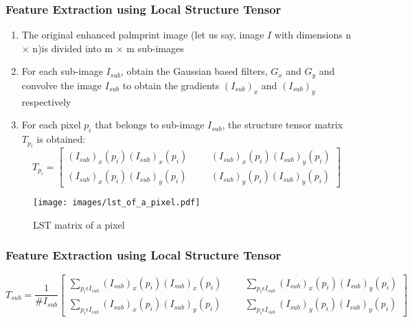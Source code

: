 \documentclass{beamer}
\begin{document}
\begin{frame}
 \frametitle{Feature Extraction using Local Structure Tensor}
  \begin{enumerate}
    \item The original enhanced palmprint image (let us say, image $I$ with dimensions n $\times$ n)is divided into m $\times$ m sub-images 
  \item For each sub-image $I_{sub}$, obtain the Gaussian based filters,
$G_x$ and $G_y$ and convolve the image $I_{sub}$ to obtain the gradients $(I_{sub})_{x}$ and $(I_{sub})_{y}$ respectively 
  \item For each pixel $p_i$ that belongs to sub-image $I_{sub}$, the structure tensor matrix $T_{p_{i}}$ is obtained:
\begin{equation}
 T_{p_{i}} = \begin{bmatrix} (I_{sub})_x(p_i) (I_{sub})_x(p_i) & & & (I_{sub})_x(p_i) (I_{sub})_y(p_i) \\ (I_{sub})_x(p_i) (I_{sub})_y(p_i) & & & (I_{sub})_y(p_i) (I_{sub})_y(p_i) \end{bmatrix}
\end{equation}
  \end{enumerate}
  \begin{figure}[htp]
\begin{center}
\texttt{[image: images/lst\_of\_a\_pixel.pdf]}
\caption{LST matrix of a pixel\label{lst_of_a_pixel} }
\end{center}
\end{figure}
 \end{frame}
 
\begin{frame}
 \frametitle{Feature Extraction using Local Structure Tensor}
\begin{equation}
 T_{sub} = \frac{1}{\# I_{sub}}\begin{bmatrix} \displaystyle\sum_{p_i \epsilon I_{sub}} (I_{sub})_x(p_i) (I_{sub})_x(p_i) & & & \displaystyle\sum_{p_i \epsilon I_{sub}} (I_{sub})_x(p_i) (I_{sub})_y(p_i) \\ \displaystyle\sum_{p_i \epsilon I_{sub}} (I_{sub})_x(p_i) (I_{sub})_y(p_i) & & & \displaystyle\sum_{p_i \epsilon I_{sub}} (I_{sub})_y(p_i) (I_{sub})_y(p_i) \end{bmatrix}
\end{equation}
\end{frame}
 
\end{document}
